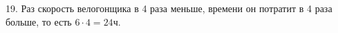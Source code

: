 19. Раз скорость велогонщика в 4 раза меньше, времени он потратит в 4 раза больше, то есть $6\cdot4=24$ч.\\
